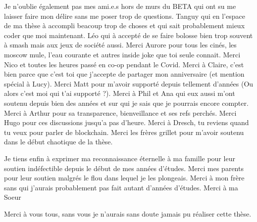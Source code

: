 Je n’oublie également pas mes ami.e.s hors de murs du BETA qui ont su me laisser faire mon délire sans me poser trop de questions. Tanguy qui en l'espace de ma thèse à accompli beacoup trop de choses et qui sait probablement mieux coder que moi maintenant. Léo qui à accepté de se faire bolosse bien trop souvent à smash mais aux jeux de société aussi. Merci Aurore pour tous les cinés, les moscow mule, l'eau courante et autres inside joke que toi seule connait. Merci Nico et toutes les heures passé en co-op pendant le Covid. Merci à Claire, c'est bien parce que c'est toi que j'accepte de partager mon anniversaire (et mention spécial à Lucy). Merci Matt pour m'avoir supporté depuis tellement d'années (Ou alors c'est moi qui t'ai supporté ?). Merci à Phil et Ana qui eux aussi m'ont soutenu depuis bien des années et sur qui je sais que je pourrais encore compter. Merci à Arthur pour sa transparence, bienveillance et ses refs perchés. Merci Hugo pour ces discussions jusqu'a pas d'heure. Merci à Dresch, tu reviens quand tu veux pour parler de blockchain. Merci les frères grillet pour m'avoir soutenu dans le début chaotique de la thèse. 

Je tiens enfin à exprimer ma reconnaissance éternelle à ma famille pour leur soutien indéfectible depuis le début de mes années d’études. Merci mes parents pour leur soutien malgrés le flou dans lequel je les plongeais. Merci à mon frère sans qui j'aurais probablement pas fait autant d'années d'études. Merci à ma Soeur  

Merci à vous tous, sans vous je n’aurais sans doute jamais pu réaliser cette thèse. 
\newpage